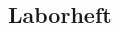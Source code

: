 \documentclass[12pt]{article}
\begin{document}
\newpage
\subsection{Laborheft}

\newpage
\listoffigures


\newpage
\thispagestyle{empty}
\begin{thebibliography}{9}

  

  
  

\end{thebibliography}
\end{document}
